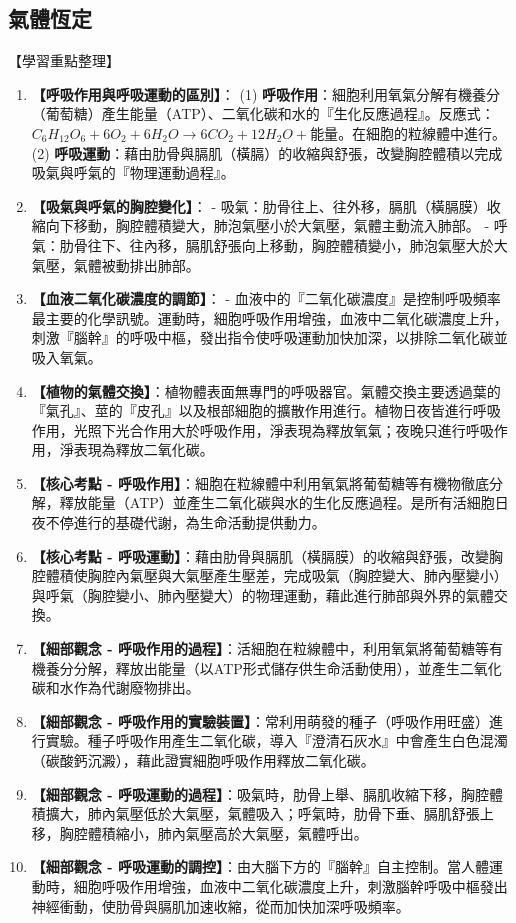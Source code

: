 \documentclass[11pt,a4paper]{article}
\begin{document}
\subsection{氣體恆定}
\begin{learningpoints}{【學習重點整理】}
\begin{enumerate}[label=\arabic*.]
  \item \textbf{【呼吸作用與呼吸運動的區別】}：
  (1) \textbf{呼吸作用}：細胞利用氧氣分解有機養分（葡萄糖）產生能量（ATP）、二氧化碳和水的『生化反應過程』。反應式：$C_6H_{12}O_6 + 6O_2 + 6H_2O \rightarrow 6CO_2 + 12H_2O + \text{能量}$。在細胞的粒線體中進行。
  (2) \textbf{呼吸運動}：藉由肋骨與膈肌（橫膈）的收縮與舒張，改變胸腔體積以完成吸氣與呼氣的『物理運動過程』。
  \item \textbf{【吸氣與呼氣的胸腔變化】}：
  - 吸氣：肋骨往上、往外移，膈肌（橫膈膜）收縮向下移動，胸腔體積變大，肺泡氣壓小於大氣壓，氣體主動流入肺部。
  - 呼氣：肋骨往下、往內移，膈肌舒張向上移動，胸腔體積變小，肺泡氣壓大於大氣壓，氣體被動排出肺部。
  \item \textbf{【血液二氧化碳濃度的調節】}：
  - 血液中的『二氧化碳濃度』是控制呼吸頻率最主要的化學訊號。運動時，細胞呼吸作用增強，血液中二氧化碳濃度上升，刺激『腦幹』的呼吸中樞，發出指令使呼吸運動加快加深，以排除二氧化碳並吸入氧氣。
  \item \textbf{【植物的氣體交換】}：植物體表面無專門的呼吸器官。氣體交換主要透過葉的『氣孔』、莖的『皮孔』以及根部細胞的擴散作用進行。植物日夜皆進行呼吸作用，光照下光合作用大於呼吸作用，淨表現為釋放氧氣；夜晚只進行呼吸作用，淨表現為釋放二氧化碳。
  \item \textbf{【核心考點 - 呼吸作用】}：細胞在粒線體中利用氧氣將葡萄糖等有機物徹底分解，釋放能量（ATP）並產生二氧化碳與水的生化反應過程。是所有活細胞日夜不停進行的基礎代謝，為生命活動提供動力。
  \item \textbf{【核心考點 - 呼吸運動】}：藉由肋骨與膈肌（橫膈膜）的收縮與舒張，改變胸腔體積使胸腔內氣壓與大氣壓產生壓差，完成吸氣（胸腔變大、肺內壓變小）與呼氣（胸腔變小、肺內壓變大）的物理運動，藉此進行肺部與外界的氣體交換。
  \item \textbf{【細部觀念 - 呼吸作用的過程】}：活細胞在粒線體中，利用氧氣將葡萄糖等有機養分分解，釋放出能量（以ATP形式儲存供生命活動使用），並產生二氧化碳和水作為代謝廢物排出。
  \item \textbf{【細部觀念 - 呼吸作用的實驗裝置】}：常利用萌發的種子（呼吸作用旺盛）進行實驗。種子呼吸作用產生二氧化碳，導入『澄清石灰水』中會產生白色混濁（碳酸鈣沉澱），藉此證實細胞呼吸作用釋放二氧化碳。
  \item \textbf{【細部觀念 - 呼吸運動的過程】}：吸氣時，肋骨上舉、膈肌收縮下移，胸腔體積擴大，肺內氣壓低於大氣壓，氣體吸入；呼氣時，肋骨下垂、膈肌舒張上移，胸腔體積縮小，肺內氣壓高於大氣壓，氣體呼出。
  \item \textbf{【細部觀念 - 呼吸運動的調控】}：由大腦下方的『腦幹』自主控制。當人體運動時，細胞呼吸作用增強，血液中二氧化碳濃度上升，刺激腦幹呼吸中樞發出神經衝動，使肋骨與膈肌加速收縮，從而加快加深呼吸頻率。
\end{enumerate}
\end{learningpoints}
\end{document}
